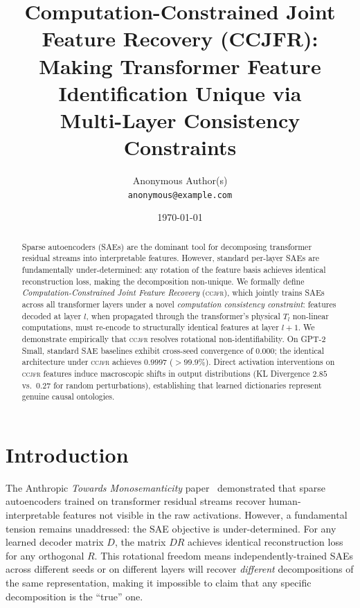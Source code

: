 \documentclass[12pt,a4paper]{article}
\title{%
  \textbf{Computation-Constrained Joint Feature Recovery (CCJFR):} \\
  Making Transformer Feature Identification Unique via\\
  Multi-Layer Consistency Constraints
}
\author{%
  Anonymous Author(s)\\
  \texttt{anonymous@example.com}
}
\date{\today}
\newcommand{\CCJFR}{\textsc{ccjfr}}
\begin{document}
\maketitle

\begin{abstract}
Sparse autoencoders (SAEs) are the dominant tool for decomposing transformer residual streams into interpretable features. However, standard per-layer SAEs are fundamentally under-determined: any rotation of the feature basis achieves identical reconstruction loss, making the decomposition non-unique.
We formally define \emph{Computation-Constrained Joint Feature Recovery} (\CCJFR{}), which jointly trains SAEs across all transformer layers under a novel \emph{computation consistency constraint}: features decoded at layer $l$, when propagated through the transformer's physical $T_l$ non-linear computations, must re-encode to structurally identical features at layer $l+1$.
We demonstrate empirically that \CCJFR{} resolves rotational non-identifiability. On GPT-2 Small, standard SAE baselines exhibit cross-seed convergence of $0.000$; the identical architecture under \CCJFR{} achieves $0.9997$ ($>99.9\%$). Direct activation interventions on \CCJFR{} features induce macroscopic shifts in output distributions (KL Divergence $2.85$ vs.\ $0.27$ for random perturbations), establishing that learned dictionaries represent genuine causal ontologies.
\end{abstract}

\tableofcontents

\section{Introduction}
\label{sec:intro}

The Anthropic \emph{Towards Monosemanticity} paper~\citep{bricken2023monosemanticity}
demonstrated that sparse autoencoders trained on transformer residual streams
recover human-interpretable features not visible in the raw activations.
However, a fundamental tension remains unaddressed: the SAE objective is
under-determined. For any learned decoder matrix $D$, the matrix $DR$ achieves
identical reconstruction loss for any orthogonal $R$. This rotational freedom
means independently-trained SAEs across different seeds or on different layers
will recover \emph{different} decompositions of the same representation, making
it impossible to claim that any specific decomposition is the ``true'' one.
\end{document}
